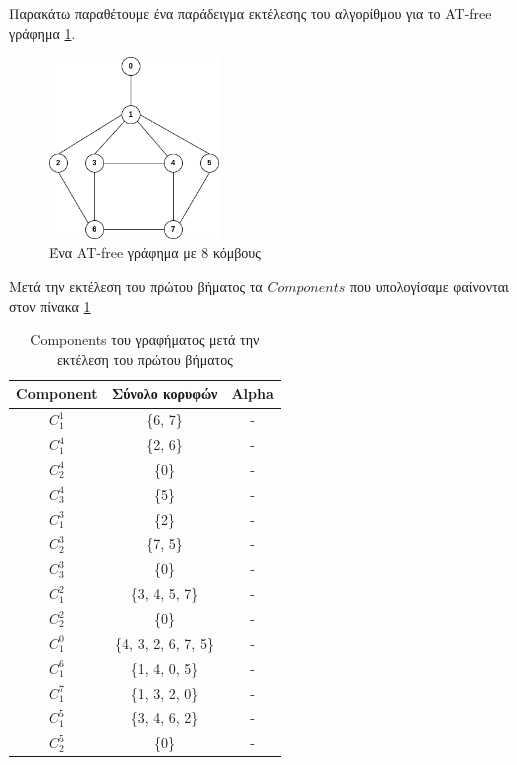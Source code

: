 Παρακάτω παραθέτουμε ένα παράδειγμα εκτέλεσης του αλγορίθμου για το AT-free γράφημα \ref{fig:at-free-graph-example}.

\begin{figure}[H]
	\centering
	\includegraphics[width=0.4\textwidth]{pictures/at-free-graph.png} 
	\caption{Ένα AT-free γράφημα με 8 κόμβους}
	\label{fig:at-free-graph-example}
\end{figure}

Μετά την εκτέλεση του πρώτου βήματος τα $Components$ που υπολογίσαμε φαίνονται στον πίνακα \ref{table:first-step-intependent-set} 

\begin{table}[H]
	
	\centering
	\caption{Components του γραφήματος μετά την εκτέλεση του πρώτου βήματος}
	\begin{tabular}{|c|c|c|}
		\hline
		\textbf{Component} & \textbf{Σύνολο κορυφών} & \textbf{Alpha} \\
		\hline
		$C_1^1$ & \quad \{6, 7\} & - \\
		$C_1^4$ & \quad \{2, 6\} & - \\
		$C_2^4$ & \quad \{0\} & - \\
		$C_3^4$ & \quad \{5\} & - \\
		$C_1^3$ & \quad \{2\} & - \\
		$C_2^3$ & \quad \{7, 5\} & - \\
		$C_3^3$ & \quad \{0\} & - \\
		$C_1^2$ & \quad \{3, 4, 5, 7\} & - \\
		$C_2^2$ & \quad \{0\} & - \\
		$C_1^0$ & \quad \{4, 3, 2, 6, 7, 5\} & - \\
		$C_1^6$ & \quad \{1, 4, 0, 5\} & - \\
		$C_1^7$ & \quad \{1, 3, 2, 0\} & - \\
		$C_1^5$ & \quad \{3, 4, 6, 2\} & - \\
		$C_2^5$ & \quad \{0\} & - \\		
		\hline
	\end{tabular}
	\label{table:first-step-intependent-set}
\end{table}

